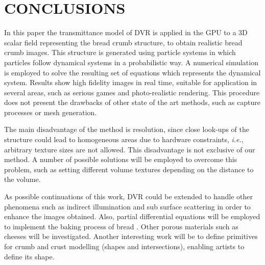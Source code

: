 \documentclass[oneside,a4paper,spanish,links]{amca}
\begin{document}



\section{CONCLUSIONS}

In this paper the transmittance model of DVR is applied in the GPU to a 3D scalar field representing the bread crumb structure, to obtain realistic bread crumb images. This structure is generated using particle systems in which particles follow dynamical systems in a probabilistic way. A numerical simulation is employed to solve the resulting set of equations which represents the dynamical system. Results show high fidelity images in real time, suitable for application in several areas, such as serious games \citep{Susi2007} and photo-realistic rendering. This procedure does not present the drawbacks of other state of the art methods, such as capture processes or mesh generation.

The main disadvantage of the method is resolution, since close look-ups of the structure could lead to homogeneous areas due to hardware constraints, {\em i.e.}, arbitrary texture sizes are not allowed. This disadvantage is not exclusive of our method. A number of possible solutions will be employed to overcome this problem, such as setting different volume textures depending on the distance to the volume. 

As possible continuations of this work, DVR could be extended to handle other phenomena such as indirect illumination and sub surface scattering in order to enhance the images obtained. Also, partial differential equations will be employed to implement the baking process of bread \citep{Purlis2012}. Other porous materials such as cheeses will be investigated. Another interesting work will be to define primitives for crumb and crust modelling (shapes and intersections), enabling artists to define its shape.

%

\end{document}
